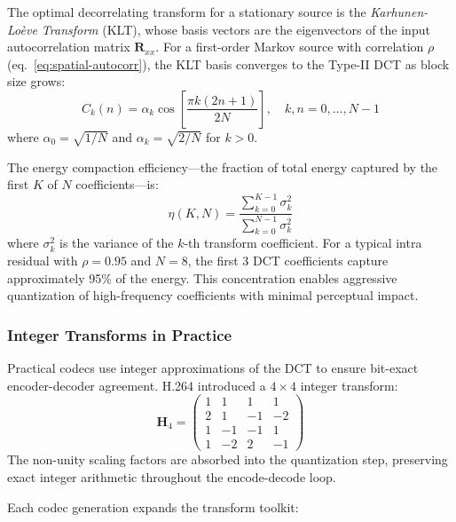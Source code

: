 The optimal decorrelating transform for a stationary source is the
\emph{Karhunen-Lo\`eve Transform} (KLT), whose basis vectors are the
eigenvectors of the input autocorrelation matrix $\mathbf{R}_{xx}$. For a
first-order Markov source with correlation $\rho$ (eq.~\ref{eq:spatial-autocorr}),
the KLT basis converges to the Type-II DCT as block size grows:
\begin{equation}
  C_k(n) = \alpha_k \cos\!\left[\frac{\pi k (2n+1)}{2N}\right],
  \quad k,n = 0, \ldots, N-1
  \label{eq:dct-ii}
\end{equation}
where $\alpha_0 = \sqrt{1/N}$ and $\alpha_k = \sqrt{2/N}$ for $k > 0$.

The energy compaction efficiency---the fraction of total energy captured by
the first $K$ of $N$ coefficients---is:
\begin{equation}
  \eta(K, N) = \frac{\sum_{k=0}^{K-1} \sigma_k^2}
    {\sum_{k=0}^{N-1} \sigma_k^2}
  \label{eq:energy-compaction}
\end{equation}
where $\sigma_k^2$ is the variance of the $k$-th transform coefficient.
For a typical intra residual with $\rho = 0.95$ and $N = 8$, the first 3
DCT coefficients capture approximately 95\% of the energy. This
concentration enables aggressive quantization of high-frequency coefficients
with minimal perceptual impact.

\subsubsection{Integer Transforms in Practice}
\label{sec:integer-transforms}

Practical codecs use integer approximations of the DCT to ensure bit-exact
encoder-decoder agreement. H.264 introduced a $4 \times 4$ integer
transform:
\begin{equation}
  \mathbf{H}_4 = \begin{pmatrix}
    1 &  1 &  1 &  1 \\
    2 &  1 & -1 & -2 \\
    1 & -1 & -1 &  1 \\
    1 & -2 &  2 & -1
  \end{pmatrix}
  \label{eq:h264-transform}
\end{equation}
The non-unity scaling factors are absorbed into the quantization step,
preserving exact integer arithmetic throughout the encode-decode loop.

Each codec generation expands the transform toolkit:


